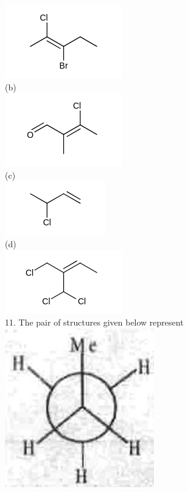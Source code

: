 \documentclass[10pt]{article}
\begin{document}
\includegraphics{smile-42d250a78bcb83d6f7317391aedd95f4bca3f5f9}\\
(b)\\
\includegraphics{smile-3ed9bfca266246602aef0af1f800c53342defdd1}\\
(c)\\
\includegraphics{smile-d88c8399bf4420235537aa23a85bfa6d0ae01723}\\
(d)\\
\includegraphics{smile-559e96f7d04d40c6ea097453b2275f390643a10d}\\
11. The pair of structures given below represent\\
\includegraphics[max width=\textwidth, center]{2025_01_28_8470952b98110cec3aabg-064(3)}\\
\end{document}
